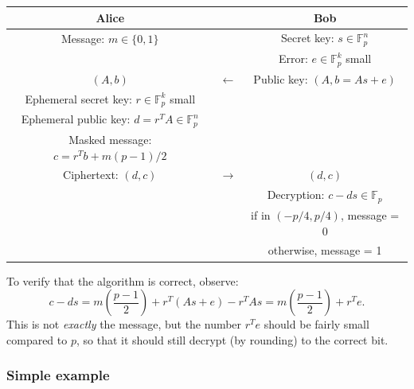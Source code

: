 \documentclass{article}
\theoremstyle{plain}
\theoremstyle{definition}
\theoremstyle{remark}
\numberwithin{theorem}{section}
\newcommand{\FF}{\mathbb{F}}
\begin{document}
     \begin{tabular}{ccc}
       Alice & & Bob \\
       \hline
       Message: $m \in \{0,1\}$ & &  Secret key: $s \in \FF_p^n$ \\
       & & Error: $e \in \FF_p^k$ small \\
       $(A,b)$ & $\longleftarrow$ & Public key: $(A, b = As+e)$ \\
       Ephemeral secret key: $r \in \FF_p^k$ small & &  \\
       Ephemeral public key: $d = r^T A \in \FF_p^n$ & &  \\
       Masked message: $c = r^T b + m(p-1)/2$ & &  \\
       Ciphertext: $(d,c)$ & $\longrightarrow$ & $(d,c)$ \\
					      & & Decryption: $c - ds \in \FF_p$ \\
                          & & if in $(-p/4,p/4)$, message = 0 \\
                          & & otherwise, message = 1
      \end{tabular}
      \vspace{3em}

      To verify that the algorithm is correct, observe:
      \[
      c - ds = m\left( \frac{p-1}{2} \right) + r^T(As+e) - r^TAs
      = m\left(\frac{p-1}{2}\right) + r^Te.
      \]
      This is not \emph{exactly} the message, but the number $r^Te$ should be fairly small compared to $p$, so that it should still decrypt (by rounding) to the correct bit.

\subsubsection{Simple example}
\end{document}
